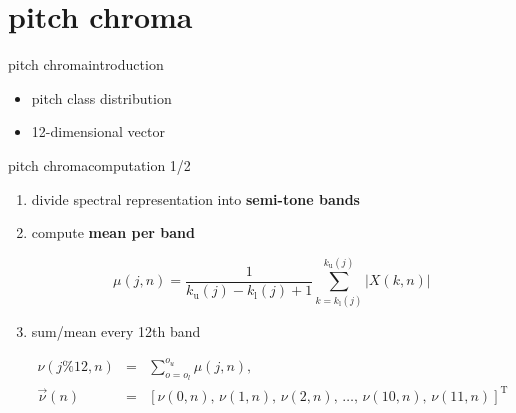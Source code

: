     \section[pitch chroma]{pitch chroma}
        \begin{frame}{pitch chroma}{introduction}
            \begin{itemize}
                \item	pitch class distribution
                \item	12-dimensional vector
            \end{itemize}
        \end{frame}
        \begin{frame}{pitch chroma}{computation 1/2}
            \begin{enumerate}
                \item	divide spectral representation into \textbf{semi-tone bands}
                \item<2->	compute \textbf{mean per band}
                    \begin{footnotesize}
                        \begin{equation*}
                            \mu(j,n)		= \frac{1}{k_{\mathrm{u}}(j)-k_{\mathrm{l}}(j)+1}\sum\limits_{k=k_{\mathrm{l}}(j)}^{k_{\mathrm{u}}(j)}{|X(k,n)|}
                        \end{equation*}
                    \end{footnotesize}
                \item<3->	sum/mean every 12th band
                    \begin{footnotesize}
                        \begin{eqnarray*}
                            \nu(j\% 12 ,n)		&=& \sum\limits_{o=o_l}^{o_u}{\mu(j,n)}\label{eq:pc}, \\
                            \vec{\nu}(n) 	&=& \left[\nu(0,n),\, \nu(1,n),\, \nu(2,n),\, \ldots,\, \nu(10,n),\, \nu(11,n)\right]^\mathrm{T} \nonumber
                        \end{eqnarray*}
                    \end{footnotesize}
            \end{enumerate}
        \end{frame}
